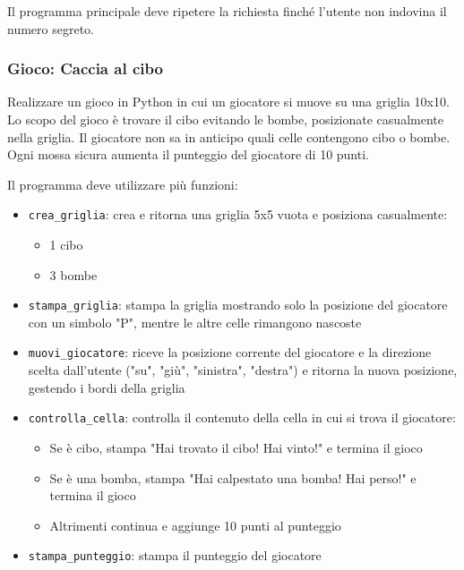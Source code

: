 \documentclass[a4paper,12pt]{article}
\begin{document}
	Il programma principale deve ripetere la richiesta finché l’utente non indovina il numero segreto.
	
	\subsubsection{Gioco: Caccia al cibo}
	Realizzare un gioco in Python in cui un giocatore si muove su una griglia 10x10.  
	Lo scopo del gioco è trovare il cibo evitando le bombe, posizionate casualmente nella griglia. Il giocatore non sa in anticipo quali celle contengono cibo o bombe. Ogni mossa sicura aumenta il punteggio del giocatore di 10 punti.
	
	Il programma deve utilizzare più funzioni:
	
	\begin{itemize}
		\item \texttt{crea\_griglia}: crea e ritorna una griglia 5x5 vuota e posiziona casualmente:
		\begin{itemize}
			\item 1 cibo
			\item 3 bombe
		\end{itemize}
		\item \texttt{stampa\_griglia}: stampa la griglia mostrando solo la posizione del giocatore con un simbolo "P", mentre le altre celle rimangono nascoste
		\item \texttt{muovi\_giocatore}: riceve la posizione corrente del giocatore e la direzione scelta dall'utente ("su", "giù", "sinistra", "destra") e ritorna la nuova posizione, gestendo i bordi della griglia
		\item \texttt{controlla\_cella}: controlla il contenuto della cella in cui si trova il giocatore:
		\begin{itemize}
			\item Se è cibo, stampa "Hai trovato il cibo! Hai vinto!" e termina il gioco
			\item Se è una bomba, stampa "Hai calpestato una bomba! Hai perso!" e termina il gioco
			\item Altrimenti continua e aggiunge 10 punti al punteggio
		\end{itemize}
		\item \texttt{stampa\_punteggio}: stampa il punteggio del giocatore
	\end{itemize}
	
\end{document}
